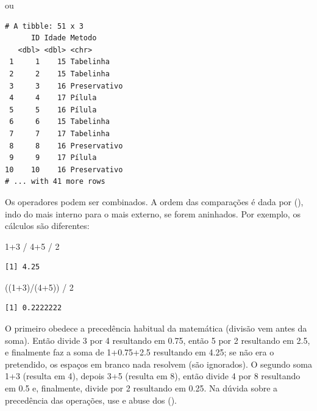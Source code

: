 \documentclass[
]{article}
\newenvironment{Shaded}{\begin{snugshade}}{\end{snugshade}}
\newcommand{\DecValTok}[1]{\textcolor[rgb]{0.00,0.00,0.81}{#1}}
\newcommand{\FunctionTok}[1]{\textcolor[rgb]{0.00,0.00,0.00}{#1}}
\newcommand{\NormalTok}[1]{#1}
\newcommand{\OtherTok}[1]{\textcolor[rgb]{0.56,0.35,0.01}{#1}}
\newcommand{\SpecialCharTok}[1]{\textcolor[rgb]{0.00,0.00,0.00}{#1}}
\begin{document}
ou

\begin{Shaded}
\end{Shaded}

\begin{verbatim}
# A tibble: 51 x 3
      ID Idade Metodo      
   <dbl> <dbl> <chr>       
 1     1    15 Tabelinha   
 2     2    15 Tabelinha   
 3     3    16 Preservativo
 4     4    17 Pílula      
 5     5    16 Pílula      
 6     6    15 Tabelinha   
 7     7    17 Tabelinha   
 8     8    16 Preservativo
 9     9    17 Pílula      
10    10    16 Preservativo
# ... with 41 more rows
\end{verbatim}

Os operadores podem ser combinados. A ordem das comparações é dada por
(), indo do mais interno para o mais externo, se forem aninhados. Por
exemplo, os cálculos são diferentes:

\begin{Shaded}
\begin{Highlighting}[]
  \DecValTok{1}\SpecialCharTok{+}\DecValTok{3} \SpecialCharTok{/} \DecValTok{4}\SpecialCharTok{+}\DecValTok{5} \SpecialCharTok{/} \DecValTok{2}
\end{Highlighting}
\end{Shaded}

\begin{verbatim}
[1] 4.25
\end{verbatim}

\begin{Shaded}
\begin{Highlighting}[]
\NormalTok{((}\DecValTok{1}\SpecialCharTok{+}\DecValTok{3}\NormalTok{)}\SpecialCharTok{/}\NormalTok{(}\DecValTok{4}\SpecialCharTok{+}\DecValTok{5}\NormalTok{)) }\SpecialCharTok{/} \DecValTok{2}
\end{Highlighting}
\end{Shaded}

\begin{verbatim}
[1] 0.2222222
\end{verbatim}

O primeiro obedece a precedência habitual da matemática (divisão vem
antes da soma). Então divide 3 por 4 resultando em 0.75, então 5 por 2
resultando em 2.5, e finalmente faz a soma de 1+0.75+2.5 resultando em
4.25; se não era o pretendido, os espaços em branco nada resolvem (são
ignorados). O segundo soma 1+3 (resulta em 4), depois 3+5 (resulta em
8), então divide 4 por 8 resultando em 0.5 e, finalmente, divide por 2
resultando em 0.25. Na dúvida sobre a precedência das operações, use e
abuse dos ().
\end{document}

